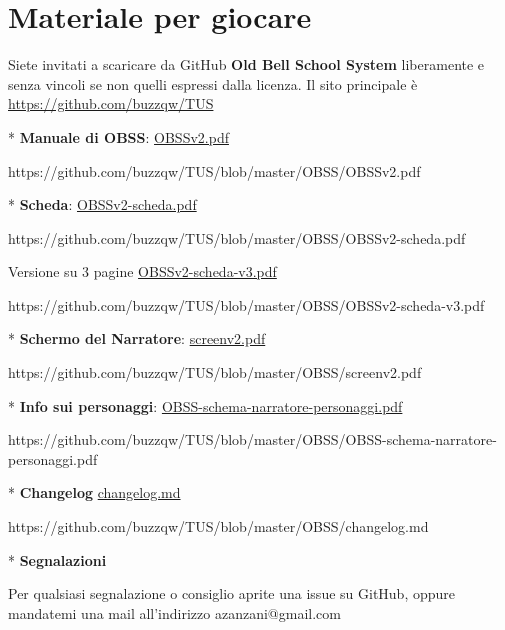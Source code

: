 \section{Materiale per giocare}

\label{scheda-e-manuale}

Siete invitati a scaricare da GitHub \textbf{Old Bell School System} liberamente e senza vincoli se non quelli espressi dalla licenza.
Il sito principale è \href{https://github.com/buzzqw/TUS}{https://github.com/buzzqw/TUS}

\medskip

* \textbf{Manuale di OBSS}:
\href{https://github.com/buzzqw/TUS/blob/master/OBSS/OBSSv2.pdf}{OBSSv2.pdf}

https://github.com/buzzqw/TUS/blob/master/OBSS/OBSSv2.pdf

\smallskip

* \textbf{Scheda}:
\href{https://github.com/buzzqw/TUS/blob/master/OBSS/OBSSv2-scheda.pdf}{OBSSv2-scheda.pdf}

https://github.com/buzzqw/TUS/blob/master/OBSS/OBSSv2-scheda.pdf

\smallskip

Versione su 3 pagine
\href{https://github.com/buzzqw/TUS/blob/master/OBSS/OBSSv2-scheda-v3.pdf}{OBSSv2-scheda-v3.pdf}

https://github.com/buzzqw/TUS/blob/master/OBSS/OBSSv2-scheda-v3.pdf

\smallskip

* \textbf{Schermo del Narratore}:
\href{https://github.com/buzzqw/TUS/blob/master/OBSS/screenv2.pdf}{screenv2.pdf}

https://github.com/buzzqw/TUS/blob/master/OBSS/screenv2.pdf

\smallskip

* \textbf{Info sui personaggi}:
\href{https://github.com/buzzqw/TUS/blob/master/OBSS/OBSS-schema-narratore-personaggi.pdf}{OBSS-schema-narratore-personaggi.pdf}

https://github.com/buzzqw/TUS/blob/master/OBSS/OBSS-schema-narratore-personaggi.pdf

\smallskip

* \textbf{Changelog} \href{https://github.com/buzzqw/TUS/blob/master/OBSS/changelog.md}{changelog.md}

https://github.com/buzzqw/TUS/blob/master/OBSS/changelog.md

\smallskip

* \textbf{Segnalazioni}

Per qualsiasi segnalazione o consiglio aprite una issue su GitHub, oppure mandatemi una mail all'indirizzo azanzani@gmail.com


